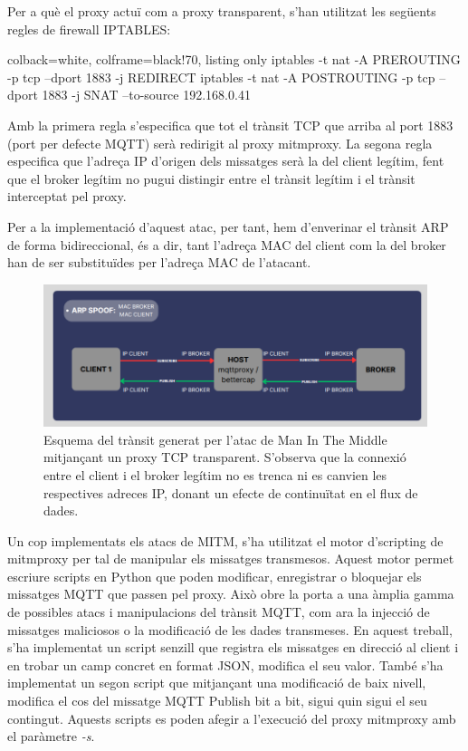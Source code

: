 Per a què el proxy actuï com a proxy transparent, s'han utilitzat les següents regles de firewall IPTABLES:

  \begin{tcblisting}{colback=white, colframe=black!70, listing only}
  iptables -t nat -A PREROUTING -p tcp --dport 1883 -j REDIRECT
  iptables -t nat -A POSTROUTING -p tcp --dport 1883 -j SNAT --to-source 192.168.0.41
  \end{tcblisting}

  Amb la primera regla s'especifica que tot el trànsit TCP que arriba al port 1883 (port per defecte MQTT) serà redirigit al proxy mitmproxy. La segona regla especifica que l'adreça IP d'origen dels missatges serà la del client legítim, fent que el broker legítim no pugui distingir entre el trànsit legítim i el trànsit interceptat pel proxy.

  Per a la implementació d'aquest atac, per tant, hem d'enverinar el trànsit ARP de forma bidireccional, és a dir, tant l'adreça MAC del client com la del broker han de ser substituïdes per l'adreça MAC de l'atacant.

  \begin{figure}[H]
    \centering
    \includegraphics[width=1\textwidth]{img/mitmproxytransp.png}
    \caption{Esquema del trànsit generat per l'atac de Man In The Middle mitjançant un proxy TCP transparent. S'observa que la connexió entre el client i el broker legítim no es trenca ni es canvien les respectives adreces IP, donant un efecte de continuïtat en el flux de dades.}
    \label{fig:MITMproxyTransparent}
  \end{figure}

  Un cop implementats els atacs de MITM, s'ha utilitzat el motor d'scripting de mitmproxy per tal de manipular els missatges transmesos. Aquest motor permet escriure scripts en Python que poden modificar, enregistrar o bloquejar els missatges MQTT que passen pel proxy. Això obre la porta a una àmplia gamma de possibles atacs i manipulacions del trànsit MQTT, com ara la injecció de missatges maliciosos o la modificació de les dades transmeses. En aquest treball, s'ha implementat un script senzill que registra els missatges en direcció al client i en trobar un camp concret en format JSON, modifica el seu valor. També s'ha implementat un segon script que mitjançant una modificació de baix nivell, modifica el cos del missatge MQTT Publish bit a bit, sigui quin sigui el seu contingut. Aquests scripts es poden afegir a l'execució del proxy mitmproxy amb el paràmetre \textit{-s}.

